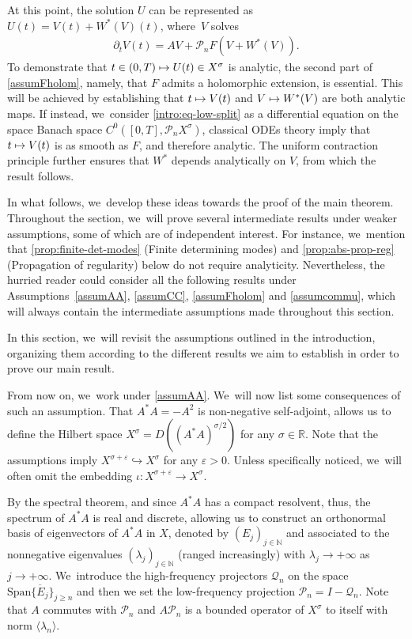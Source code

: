 \documentclass[JEP,XML,SOM,Unicode,published]{cedram}
\newcommand\mto{\mathchoice{\longmapsto}{\mapsto}{\mapsto}{\mapsto}}
\theoremstyle{definition}
\let\ld\lambda
\let\veps\varepsilon
\newcommand{\R}{\mathbb{R}}
\newcommand{\N}{\mathbb{N}}
\newcommand{\Q}{\mathcal{Q}}
\renewcommand{\P}{\mathcal{P}}
\providecommand{\inn}[1]{\langle#1\rangle}
\begin{document}
At this point, the solution $U$ can be represented as $U(t)=V(t)+W^*(V)(t)$, where~$V$ solves
\begin{align}\label{intro:eq-low-split}
\partial_t V(t)=AV+\P_n F(V+W^*(V)).
\end{align}
To demonstrate that $t\in (0, T)\mto U(t)\in X^\sigma$ is analytic, the second part of \cref{assumFholom}, namely, that $F$ admits a holomorphic extension, is essential. This will be achieved by establishing that $t\mto V(t)$ and $V\mto W^*(V)$ are both analytic maps. If instead, we~consider \eqref{intro:eq-low-split} as a differential equation on the space Banach space $C^0([0, T], \P_n X^\sigma)$, classical ODEs theory imply that $t\mto V(t)$ is as smooth as $F$, and therefore analytic. The uniform contraction principle further ensures that $W^*$ depends analytically on $V$, from which the result follows.

In what follows, we~develop these ideas towards the proof of the main theorem. Throughout the section, we~will prove several intermediate results under weaker assumptions, some of which are of independent interest. For instance, we~mention that \cref{prop:finite-det-modes} (Finite determining modes) and \cref{prop:abs-prop-reg} (Propagation of regularity) below do not require analyticity. Nevertheless, the hurried reader could consider all the following results under Assumptions~\ref{assumAA}, \ref{assumCC}, \ref{assumFholom} and \ref{assumcommu}, which will always contain the intermediate assumptions made throughout this section.

 In this section, we~will revisit the assumptions outlined in the introduction, organizing them according to the different results we aim to establish in order to prove our main result.

From now on, we~work under \cref{assumAA}. We~will now list some consequences of such an assumption. That $A^*A=-A^2$ is non-negative self-adjoint, allows us to define the Hilbert space $X^{\sigma}=D((A^*A)^{\sigma/2})$ for any $\sigma\in\R$. Note that the assumptions imply $X^{\sigma+\veps}\hookrightarrow X^{\sigma} $ for any $\veps>0$. Unless specifically noticed, we~will often omit the embedding $\iota: X^{\sigma+\veps}\to X^{\sigma}$.

By the spectral theorem, and since $A^*A$ has a compact resolvent, thus, the spectrum of $A^*A$ is real and discrete, allowing us to construct an orthonormal basis of eigenvectors of $A^*A$ in $X$, denoted by $(E_j)_{j\in\N}$ and associated to the nonnegative eigenvalues $(\lambda_j)_{j\in \N}$ (ranged increasingly) with $\lambda_j \to+\infty$ as $j\to +\infty$. We~introduce the high-frequency projectors $\Q_n$ on the space $\overline{\text{Span}\{E_j\}_{j\geq n}}$ and then we set the low-frequency projection $\P_n=I-\Q_n$. Note that $A$ commutes with $\P_n$ and $A\P_n$ is a bounded operator of $X^{\sigma}$ to itself with norm $\inn{\ld_n}$.
\end{document}
